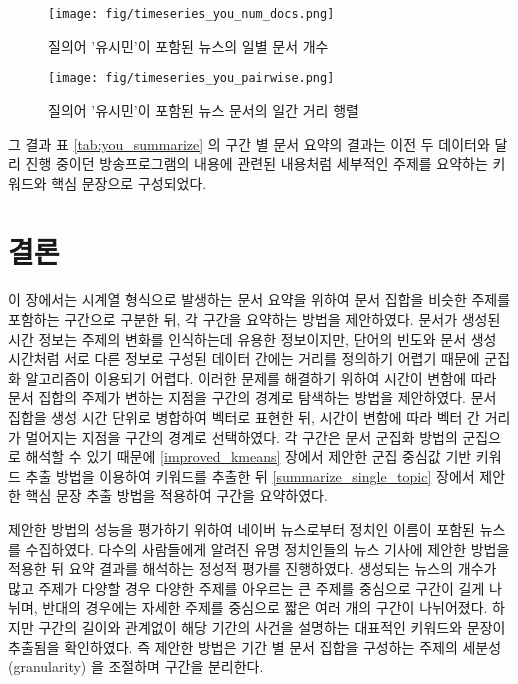 \documentclass[oneside, ko,phd]{snuthesis_utf8_kor}
\begin{document}
\begin{figure}[H]
\centering
\texttt{[image: fig/timeseries\_you\_num\_docs.png]}
\caption{질의어 '유시민'이 포함된 뉴스의 일별 문서 개수}
\label{fig:timeseries_you_num_docs}
\end{figure}

\begin{figure}[H]
\centering
\texttt{[image: fig/timeseries\_you\_pairwise.png]}
\caption{질의어 '유시민'이 포함된 뉴스 문서의 일간 거리 행렬}
\label{fig:timeseries_you_pairwise}
\end{figure}

그 결과 표 \ref{tab:you_summarize} 의 구간 별 문서 요약의 결과는 이전 두 데이터와 달리 진행 중이던 방송프로그램의 내용에 관련된 내용처럼 세부적인 주제를 요약하는 키워드와 핵심 문장으로 구성되었다.


\section{결론}

이 장에서는 시계열 형식으로 발생하는 문서 요약을 위하여 문서 집합을 비슷한 주제를 포함하는 구간으로 구분한 뒤, 각 구간을 요약하는 방법을 제안하였다.
문서가 생성된 시간 정보는 주제의 변화를 인식하는데 유용한 정보이지만, 단어의 빈도와 문서 생성 시간처럼 서로 다른 정보로 구성된 데이터 간에는 거리를 정의하기 어렵기 때문에 군집화 알고리즘이 이용되기 어렵다.
이러한 문제를 해결하기 위하여 시간이 변함에 따라 문서 집합의 주제가 변하는 지점을 구간의 경계로 탐색하는 방법을 제안하였다.
문서 집합을 생성 시간 단위로 병합하여 벡터로 표현한 뒤, 시간이 변함에 따라 벡터 간 거리가 멀어지는 지점을 구간의 경계로 선택하였다.
각 구간은 문서 군집화 방법의 군집으로 해석할 수 있기 때문에 \ref{improved_kmeans} 장에서 제안한 군집 중심값 기반 키워드 추출 방법을 이용하여 키워드를 추출한 뒤 \ref{summarize_single_topic} 장에서 제안한 핵심 문장 추출 방법을 적용하여 구간을 요약하였다.

제안한 방법의 성능을 평가하기 위하여 네이버 뉴스로부터 정치인 이름이 포함된 뉴스를 수집하였다.
다수의 사람들에게 알려진 유명 정치인들의 뉴스 기사에 제안한 방법을 적용한 뒤 요약 결과를 해석하는 정성적 평가를 진행하였다.
생성되는 뉴스의 개수가 많고 주제가 다양할 경우 다양한 주제를 아우르는 큰 주제를 중심으로 구간이 길게 나뉘며, 반대의 경우에는 자세한 주제를 중심으로 짧은 여러 개의 구간이 나뉘어졌다.
하지만 구간의 길이와 관계없이 해당 기간의 사건을 설명하는 대표적인 키워드와 문장이 추출됨을 확인하였다.
즉 제안한 방법은 기간 별 문서 집합을 구성하는 주제의 세분성 (granularity) 을 조절하며 구간을 분리한다.
\end{document}
